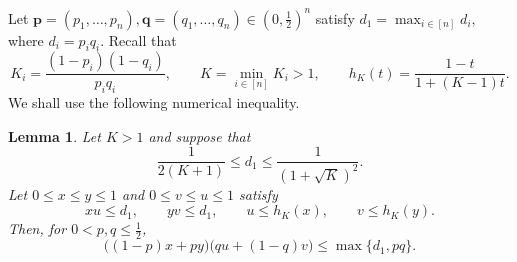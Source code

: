 \documentclass[11pt]{article}
\numberwithin{equation}{section}
\newtheorem{lemma}[theorem]{Lemma}
\theoremstyle{definition}
\theoremstyle{remark}
\begin{document}
Let $\mathbf p=(p_1,\ldots,p_n), \mathbf q=(q_1,\ldots,q_n)\in(0,\frac{1}{2})^n$ satisfy
$
 d_1=\max_{i\in[n]}d_i,
$
where $d_i=p_iq_i$. Recall that
\begin{equation*}
 K_i=\frac{(1-p_i)(1-q_i)}{p_iq_i},
 \qquad
 K=\min_{i\in[n]}K_i>1,\qquad  h_K(t)=\frac{1-t}{1+(K-1)t}.
\end{equation*}
We shall use the following numerical inequality.


\begin{lemma}\label{lem:bellman}
Let $K>1$ and suppose that
\begin{equation*}
 \frac{1}{2(K+1)}
 \leq d_1
 \leq
 \frac{1}{(1+\sqrt K)^2}.
\end{equation*}
Let $0\leq x\leq y\leq1$ and $0\leq v\leq u\leq1$ satisfy
\begin{equation*}
 xu\leq d_1,
 \qquad
 yv\leq d_1,
 \qquad
 u\leq h_K(x),
 \qquad
 v\leq h_K(y).
\end{equation*}
Then, for $0<p,q\leq\frac{1}{2}$,
\begin{equation}
 \bigl((1-p)x+py\bigr)
 \bigl(qu+(1-q)v\bigr)
 \leq
 \max\{d_1,pq\}.
 \label{eq:bellman}
\end{equation}
\end{lemma}
\end{document}
